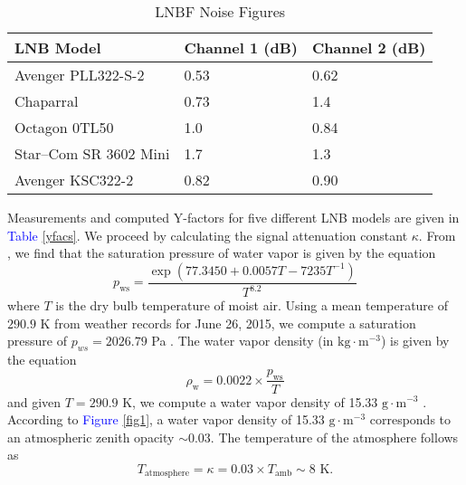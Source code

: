 \documentclass[11pt]{article}
\begin{document}
\begin{table}[]
\centering
\begin{tabular}{|l|l|l|}
\hline
{\bf LNB Model}      & {\bf Channel 1 (dB)} & {\bf Channel 2 (dB)} \\ \hline
Avenger PLL322-S-2    & 0.53                 & 0.62                 \\ \hline
Chaparral             & 0.73                 & 1.4                \\ \hline
Octagon 0TL50         & 1.0                 & 0.84                 \\ \hline
Star--Com SR 3602 Mini & 1.7                 & 1.3                 \\ \hline
Avenger KSC322-2      & 0.82                 & 0.90               \\ \hline
\end{tabular}
\caption{LNBF Noise Figures}
\label{nfs}
\end{table}
Measurements and computed Y-factors for five different LNB models are given in \textcolor{blue}{Table} \ref{yfacs}. We proceed by calculating the signal attenuation constant $\kappa$. From \cite{EngBox}, we find that the saturation pressure of water vapor is given by the equation
	\begin{equation}
		p_\text{ws} = \frac{\exp\left(77.3450+0.0057T-7235T^{-1}\right)}{T^{8.2}}
	\end{equation}
where $T$ is the dry bulb temperature of moist air. Using a mean temperature of $290.9$ K from weather records  for June 26, 2015, we compute a saturation pressure of $p_{ws} = 2026.79$ Pa \cite{Weath}. The water vapor density (in $\text{kg}\cdot\text{m}^{-3}$) is given by the equation
	\begin{equation}
		\rho_\text{w} = 0.0022\times\frac{p_\text{ws}}{T}
	\end{equation}
and given $T=290.9$ K, we compute a water vapor density of 15.33 $\text{g}\cdot\text{m}^{-3}$ \cite{EngBox}. According to \textcolor{blue}{Figure} \ref{fig1}, a water vapor density of 15.33 $\text{g}\cdot\text{m}^{-3}$ corresponds to an atmospheric zenith opacity $\sim 0.03$. The temperature of the atmosphere follows as
	\begin{equation}
		T_\text{atmosphere} = \kappa = 0.03\times T_\text{amb} \sim 8 \text{ K}.
	\end{equation}
\end{document}
